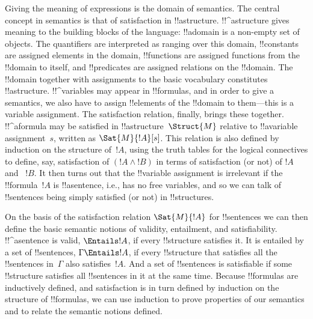 \documentclass[../../../include/open-logic-section]{subfiles}
\begin{document}

Giving the meaning of expressions is the domain of semantics.  The
central concept in semantics is that of satisfaction in
!!a{structure}. !!^a{structure} gives meaning to the building blocks
of the language: !!a{domain} is a non-empty set of objects. The
quantifiers are interpreted as ranging over this domain, !!{constant}s
are assigned elements in the domain, !!{function}s are assigned
functions from the !!{domain} to itself, and !!{predicate}s are
assigned relations on the !!{domain}.  The !!{domain} together with
assignments to the basic vocabulary constitutes !!a{structure}.
!!^{variable}s may appear in !!{formula}s, and in order to give a
semantics, we also have to assign !!{element}s of the !!{domain} to
them---this is a variable assignment. The satisfaction relation,
finally, brings these together. !!^a{formula} may be satisfied in
!!a{structure}~$\Struct{M}$ relative to !!a{variable} assignment~$s$,
written as $\Sat{M}{!A}[s]$. This relation is also defined by
induction on the structure of~$!A$, using the truth tables for the
logical connectives to define, say, satisfaction of $(!A \land !B)$ in
terms of satisfaction (or not) of $!A$ and ~$!B$.  It then turns out
that the !!{variable} assignment is irrelevant if the !!{formula}~$!A$
is !!a{sentence}, i.e., has no free variables, and so we can talk of
!!{sentence}s being simply satisfied (or not) in !!{structure}s.

On the basis of the satisfaction relation $\Sat{M}{!A}$ for !!{sentence}s
we can then define the basic semantic notions of validity, entailment,
and satisfiability. !!^a{sentence} is valid, $\Entails !A$, if every
!!{structure} satisfies it. It is entailed by a set of !!{sentence}s,
$\Gamma \Entails !A$, if every !!{structure} that satisfies all the
!!{sentence}s in~$\Gamma$ also satisfies~$!A$. And a set of !!{sentence}s
is satisfiable if some !!{structure} satisfies all !!{sentence}s in it
at the same time.  Because !!{formula}s are inductively defined, and
satisfaction is in turn defined by induction on the structure of
!!{formula}s, we can use induction to prove properties of our
semantics and to relate the semantic notions defined.
\end{document}
